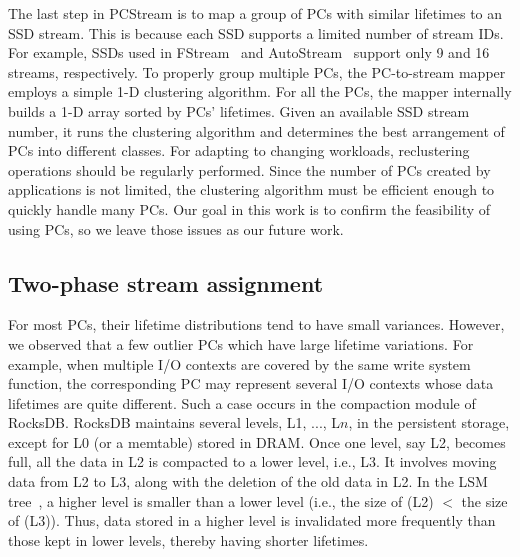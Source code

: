 The last step in \textsf{\small PCStream} is to map
a group of PCs with similar lifetimes to an SSD stream.
This is because each SSD supports a limited number of stream IDs. For
example, SSDs used in \textsf{\small FStream}~\cite{FStream} and \textsf{\small AutoStream}~\cite{AutoStream}
support only 9 and 16 streams, respectively. To properly group multiple PCs,
the PC-to-stream mapper employs a simple 1-D clustering algorithm.  For all the
PCs, the mapper internally builds a 1-D array sorted by PCs' lifetimes.  Given
an available SSD stream number, it runs the clustering algorithm and determines
the best arrangement of PCs into different classes.  For adapting to changing
workloads, reclustering operations should be regularly performed. Since the
number of PCs created by applications is not limited, the clustering algorithm
must be efficient enough to quickly handle many PCs. Our goal in this work is
to confirm the feasibility of using PCs, so we leave
those issues as our future work.

\vspace{-10pt}
\subsection{Two-phase stream assignment}
\vspace{-3pt}

For most PCs, their lifetime distributions tend to have small variances.  
However, we observed that a few outlier PCs which have large lifetime variations. 
For example, when multiple I/O contexts are covered by the same write system function, 
the corresponding PC may represent several I/O contexts whose data lifetimes are quite different.   
Such a case occurs %
in the compaction module of RocksDB.
RocksDB maintains
several levels, L1, ..., L$n$, in the persistent storage, except for L0 (or a
memtable) stored in DRAM.  Once one level, say L2, becomes full, all the data
in L2 is compacted to a lower level, i.e., L3.  It involves moving data from L2
to L3, along with the deletion of the old data in L2.  In the
LSM tree~\cite{LSM}, a higher level is smaller than a lower level 
(i.e., the size of (L2) $<$ the size of (L3)). 
Thus, data stored in a higher level is invalidated more frequently than those kept
in lower levels, thereby having shorter lifetimes.


